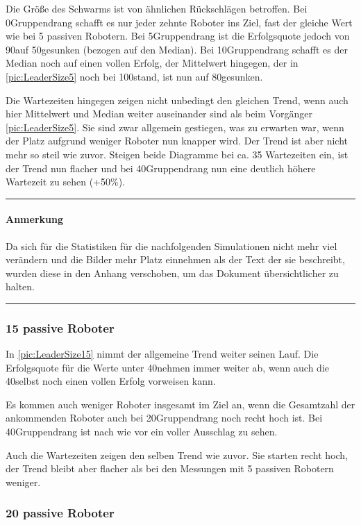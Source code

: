 Die Größe des Schwarms ist von ähnlichen Rückschlägen betroffen. Bei 0\per Gruppendrang schafft es nur jeder zehnte Roboter ins Ziel, fast der gleiche Wert wie bei 5 passiven Robotern. Bei 5\per Gruppendrang ist die Erfolgsquote jedoch von 90\per auf 50\per gesunken (bezogen auf den Median).
Bei 10\per Gruppendrang schafft es der Median noch auf einen vollen Erfolg, der Mittelwert hingegen, der in \autoref{pic:LeaderSize5} noch bei 100\per stand, ist nun auf 80\per gesunken.

Die Wartezeiten hingegen zeigen nicht unbedingt den gleichen Trend, wenn auch hier Mittelwert und Median weiter auseinander sind als beim Vorgänger \autoref{pic:LeaderSize5}. Sie sind zwar allgemein gestiegen, was zu erwarten war, wenn der Platz aufgrund weniger Roboter nun knapper wird. Der Trend ist aber nicht mehr so steil wie zuvor. Steigen beide Diagramme bei ca. 35 Wartezeiten ein, ist der Trend nun flacher und bei 40\per Gruppendrang nun eine deutlich höhere Wartezeit zu sehen (+50\%).

\newpage

\hrule
\paragraph*{Anmerkung}
Da sich für die Statistiken für die nachfolgenden Simulationen nicht mehr viel verändern und die Bilder mehr Platz einnehmen als der Text der sie beschreibt, wurden diese in den Anhang verschoben, um das Dokument übersichtlicher zu halten.\\
\hrule

\subsubsection*{15 passive Roboter}

In \autoref{pic:LeaderSize15} nimmt der allgemeine Trend weiter seinen Lauf. Die Erfolgsquote für die Werte unter 40\per nehmen immer weiter ab, wenn auch die 40\per selbst noch einen vollen Erfolg vorweisen kann.

Es kommen auch weniger Roboter insgesamt im Ziel an, wenn die Gesamtzahl der ankommenden Roboter auch bei 20\per Gruppendrang noch recht hoch ist. Bei 40\per Gruppendrang ist nach wie vor ein voller Ausschlag zu sehen.

Auch die Wartezeiten zeigen den selben Trend wie zuvor. Sie starten recht hoch, der Trend bleibt aber flacher als bei den Messungen mit 5 passiven Robotern weniger.

\subsubsection*{20 passive Roboter}

